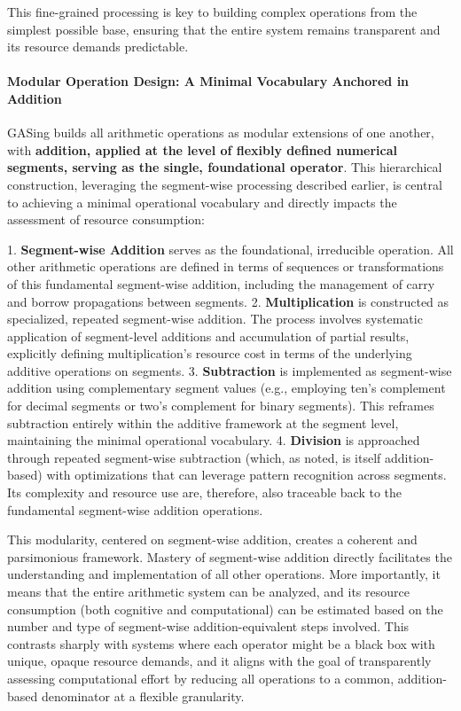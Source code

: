 This fine-grained processing is key to building complex operations from the simplest possible base, ensuring that the entire system remains transparent and its resource demands predictable.
\paragraph{Modular Operation Design: A Minimal Vocabulary Anchored in Addition}

GASing builds all arithmetic operations as modular extensions of one another, with \textbf{addition, applied at the level of flexibly defined numerical segments, serving as the single, foundational operator}. This hierarchical construction, leveraging the segment-wise processing described earlier, is central to achieving a minimal operational vocabulary and directly impacts the assessment of resource consumption:

1.  \textbf{Segment-wise Addition} serves as the foundational, irreducible operation. All other arithmetic operations are defined in terms of sequences or transformations of this fundamental segment-wise addition, including the management of carry and borrow propagations between segments.
2.  \textbf{Multiplication} is constructed as specialized, repeated segment-wise addition. The process involves systematic application of segment-level additions and accumulation of partial results, explicitly defining multiplication's resource cost in terms of the underlying additive operations on segments.
3.  \textbf{Subtraction} is implemented as segment-wise addition using complementary segment values (e.g., employing ten's complement for decimal segments or two's complement for binary segments). This reframes subtraction entirely within the additive framework at the segment level, maintaining the minimal operational vocabulary.
4.  \textbf{Division} is approached through repeated segment-wise subtraction (which, as noted, is itself addition-based) with optimizations that can leverage pattern recognition across segments. Its complexity and resource use are, therefore, also traceable back to the fundamental segment-wise addition operations.

This modularity, centered on segment-wise addition, creates a coherent and parsimonious framework. Mastery of segment-wise addition directly facilitates the understanding and implementation of all other operations. More importantly, it means that the entire arithmetic system can be analyzed, and its resource consumption (both cognitive and computational) can be estimated based on the number and type of segment-wise addition-equivalent steps involved. This contrasts sharply with systems where each operator might be a black box with unique, opaque resource demands, and it aligns with the goal of transparently assessing computational effort by reducing all operations to a common, addition-based denominator at a flexible granularity.
